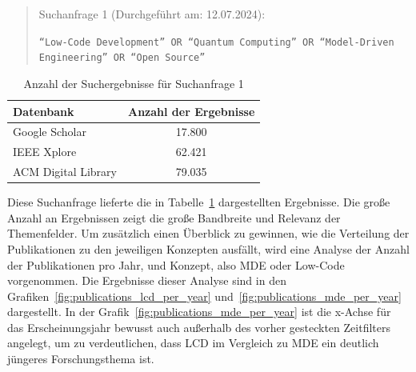 \begin{quote}
    Suchanfrage 1 (Durchgeführt am: 12.07.2024):

    \texttt{``Low-Code Development'' OR ``Quantum Computing'' OR ``Model-Driven Engineering'' OR ``Open Source''}

\end{quote}

\begin{table}[h!]
    \centering
    \caption{Anzahl der Suchergebnisse für Suchanfrage 1}
    \begin{tabular}{|l|c|}
        \hline
        \textbf{Datenbank} & \textbf{Anzahl der Ergebnisse} \\ \hline
        Google Scholar & 17.800 \\ \hline
        IEEE Xplore & 62.421 \\ \hline
        ACM Digital Library & 79.035 \\ \hline
    \end{tabular}
\label{tab:search_1_results}
\end{table}
    
Diese Suchanfrage lieferte die in Tabelle~\ref{tab:search_1_results} dargestellten Ergebnisse. Die große Anzahl an Ergebnissen 
zeigt die große Bandbreite und Relevanz der Themenfelder. Um zusätzlich einen Überblick zu gewinnen, 
wie die Verteilung der Publikationen zu den jeweiligen Konzepten ausfällt, 
wird eine Analyse der Anzahl der Publikationen pro Jahr, und Konzept, also MDE oder Low-Code vorgenommen. 
Die Ergebnisse dieser Analyse sind in den Grafiken~\ref{fig:publications_lcd_per_year} und~\ref{fig:publications_mde_per_year} dargestellt. 
In der Grafik~\ref{fig:publications_mde_per_year} ist die x-Achse für das Erscheinungsjahr bewusst auch außerhalb des vorher gesteckten Zeitfilters 
angelegt, um zu verdeutlichen, dass LCD im Vergleich zu MDE ein deutlich jüngeres Forschungsthema ist.


